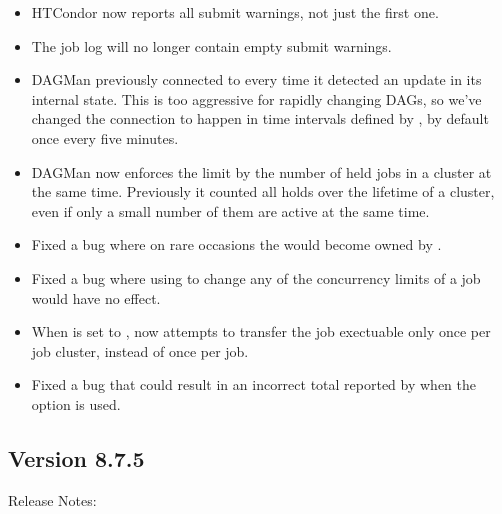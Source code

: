 \begin{itemize}

\item HTCondor now reports all submit warnings, not just the first one.

\item The job log will no longer contain empty submit warnings.

\item DAGMan previously connected to  every time it detected
an update in its internal state. This is too aggressive for rapidly changing
DAGs, so we've changed the connection to happen in time intervals defined by
, by default once every five minutes.

\item DAGMan now enforces the  limit by the
number of held jobs in a cluster at the same time. Previously it counted all
holds over the lifetime of a cluster, even if only a small number of them are
active at the same time.

\item Fixed a bug where on rare occasions the  would
become owned by .

\item Fixed a bug where using 
to change any of the concurrency limits of a job would have no effect.

\item When  is set to ,
 now attempts to transfer the job exectuable only once per
job cluster, instead of once per job.

\item Fixed a bug that could result in an incorrect total reported by
 when the  option is used.

\end{itemize}

\subsection*{\label{sec:New-8-7-5}Version 8.7.5}

\noindent Release Notes:

